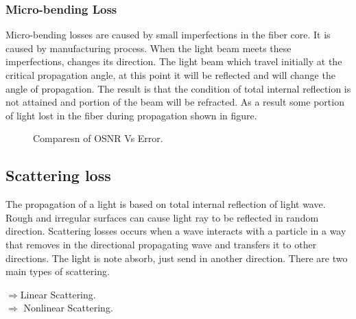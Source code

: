 \documentclass[12pt]{report}
\begin{document}
	\subsubsection{Micro-bending Loss}
	Micro-bending losses are caused by small imperfections in the fiber core. It is caused by manufacturing process. When the light beam meets these imperfections, changes its direction. The light beam which travel initially at the critical propagation angle, at this point it will be reflected and will change the angle of propagation. The result is that the condition of total internal reflection is not attained and portion of the beam will be refracted. As a result some portion of light lost in the fiber during propagation shown in figure.
	\begin{figure}[htbp]
		\caption{Comparesn of OSNR Vs Error.}
		\label{fig1}
	\end{figure}
	
	\subsection{ Scattering loss}
	The propagation of a light is based on total internal reflection of light wave. Rough and irregular surfaces can cause light ray to be reflected in random direction. Scattering losses occurs when a wave interacts with a particle in a way that removes in the directional propagating wave and transfers it to other directions. The light is note absorb, just send in another direction. There are two main types of scattering.\\ 
	\begin{center}
		$\Rightarrow$Linear Scattering.\\
		$\Rightarrow$ Nonlinear Scattering.\\
	\end{center}
	
\end{document}
